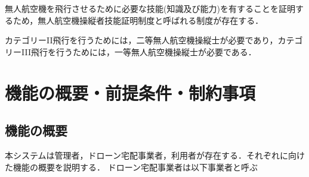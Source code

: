 \documentclass[a4paper, titlepage]{jsarticle}
\begin{document}
無人航空機を飛行させるために必要な技能(知識及び能力)を有することを証明するため，無人航空機操縦者技能証明制度と呼ばれる制度が存在する．

カテゴリーII飛行を行うためには，二等無人航空機操縦士が必要であり，カテゴリーIII飛行を行うためには，一等無人航空機操縦士が必要である．\cite{delivery_guidelines_2023}



\section{機能の概要・前提条件・制約事項}
\subsection{機能の概要}
本システムは管理者，ドローン宅配事業者，利用者が存在する．それぞれに向けた機能の概要を説明する．
ドローン宅配事業者は以下事業者と呼ぶ
\end{document}

